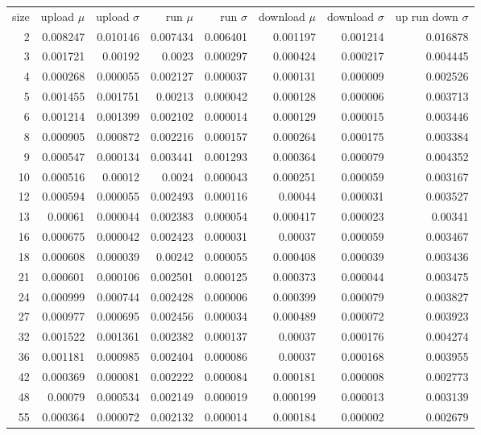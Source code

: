 \begin{longtable}{r r r r r r r r}
size & upload $\mu$  & upload $\sigma$ & run $\mu$ & run $\sigma$ & download $\mu$ & download $\sigma$ & up run down $\sigma$ \\
2 & 0.008247 & 0.010146 & 0.007434 & 0.006401 & 0.001197 & 0.001214 & 0.016878 \\
3 & 0.001721 & 0.00192 & 0.0023 & 0.000297 & 0.000424 & 0.000217 & 0.004445 \\
4 & 0.000268 & 0.000055 & 0.002127 & 0.000037 & 0.000131 & 0.000009 & 0.002526 \\
5 & 0.001455 & 0.001751 & 0.00213 & 0.000042 & 0.000128 & 0.000006 & 0.003713 \\
6 & 0.001214 & 0.001399 & 0.002102 & 0.000014 & 0.000129 & 0.000015 & 0.003446 \\
8 & 0.000905 & 0.000872 & 0.002216 & 0.000157 & 0.000264 & 0.000175 & 0.003384 \\
9 & 0.000547 & 0.000134 & 0.003441 & 0.001293 & 0.000364 & 0.000079 & 0.004352 \\
10 & 0.000516 & 0.00012 & 0.0024 & 0.000043 & 0.000251 & 0.000059 & 0.003167 \\
12 & 0.000594 & 0.000055 & 0.002493 & 0.000116 & 0.00044 & 0.000031 & 0.003527 \\
13 & 0.00061 & 0.000044 & 0.002383 & 0.000054 & 0.000417 & 0.000023 & 0.00341 \\
16 & 0.000675 & 0.000042 & 0.002423 & 0.000031 & 0.00037 & 0.000059 & 0.003467 \\
18 & 0.000608 & 0.000039 & 0.00242 & 0.000055 & 0.000408 & 0.000039 & 0.003436 \\
21 & 0.000601 & 0.000106 & 0.002501 & 0.000125 & 0.000373 & 0.000044 & 0.003475 \\
24 & 0.000999 & 0.000744 & 0.002428 & 0.000006 & 0.000399 & 0.000079 & 0.003827 \\
27 & 0.000977 & 0.000695 & 0.002456 & 0.000034 & 0.000489 & 0.000072 & 0.003923 \\
32 & 0.001522 & 0.001361 & 0.002382 & 0.000137 & 0.00037 & 0.000176 & 0.004274 \\
36 & 0.001181 & 0.000985 & 0.002404 & 0.000086 & 0.00037 & 0.000168 & 0.003955 \\
42 & 0.000369 & 0.000081 & 0.002222 & 0.000084 & 0.000181 & 0.000008 & 0.002773 \\
48 & 0.00079 & 0.000534 & 0.002149 & 0.000019 & 0.000199 & 0.000013 & 0.003139 \\
55 & 0.000364 & 0.000072 & 0.002132 & 0.000014 & 0.000184 & 0.000002 & 0.002679 \\

\end{longtable}
